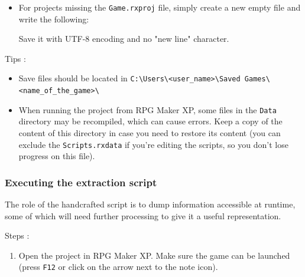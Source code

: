 \documentclass[11pt]{article}
\begin{document}
{\begin{itemize}
	\texttt{RGSS Tool}\footnote{https://gitlab.com/rgss/rgsstool} was used :
	
	\begin{lstlisting}
	python rgsstool.py -x -d "path\for\output\files" "path\of\rgssad\file"\end{lstlisting}
	\vspace{-8mm}
	
	This worked with Python 3.x, google search it if you're not sure if you have a recent version of Python and how to launch it on your computer.
	
	Exemple for Pokemon Uranium when command line is at root :
	
	\begin{lstlisting}
	python rgsstool.py -x -d . Uranium.rgssad\end{lstlisting}
	\vspace{-6mm}
	
	\item For projects missing the \verb|Game.rxproj| file, simply create a new empty file and write the following: 
	
	
	Save it with UTF-8 encoding and no "new line" character.
\end{itemize}

\newpage 
Tips :
\begin{itemize}
	\item Save files should be located in \verb|C:\Users\<user_name>\Saved Games\<name_of_the_game>\|
	
	\item When running the project from RPG Maker XP, some files in the \verb|Data| directory may be recompiled, which can cause errors. Keep a copy of the content of this directory in case you need to restore its content (you can exclude the \verb|Scripts.rxdata| if you're editing the scripts, so you don't lose progress on this file).
\end{itemize}
\hfill

\subsubsection{Executing the extraction script}

The role of the handcrafted script is to dump information accessible at runtime, some of which will need further processing to give it a useful representation.

Steps :
\begin{enumerate}
	\item Open the project in RPG Maker XP. Make sure the game can be launched (press \verb|F12| or click on the arrow next to the note icon).
	

\end{enumerate}}
\end{document}
